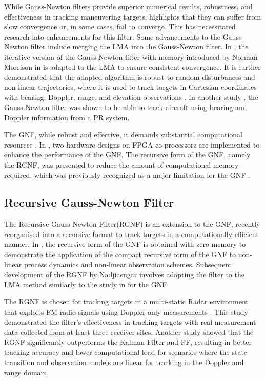 While Gauss-Newton filters provide superior numerical results, robustness, and effectiveness in tracking maneuvering targets, \cite{nmorris2013} highlights that they can suffer from slow convergence or, in some cases, fail to converge. This has necessitated research into enhancements for this filter. Some advancements to the Gauss-Newton filter include merging the \ac{LMA} into the Gauss-Newton filter. In \cite{roaldje}, the iterative version of the Gauss-Newton filter with memory introduced by Norman Morrison in \cite{NmorrisHIll} is adapted to the \ac{LMA} to ensure consistent convergence. It is further demonstrated that the adapted algorithm is robust to random disturbances and non-linear trajectories, where it is used to track targets in Cartesian coordinates with bearing, Doppler, range, and elevation observations \cite{roaldje}. In another study \cite{Morrison}, the Gauss-Newton filter was shown to be able to track aircraft using bearing and Doppler information from a \ac{PR} system.

The \ac{GNF}, while robust and effective, it demands substantial computational resources \cite{improvedGauss}. In \cite{costa}, two hardware designs on \ac{FPGA} co-processors are implemented to enhance the performance of the \ac{GNF}. The recursive form of the \ac{GNF}, namely the \ac{RGNF}, was presented to reduce the amount of computational memory required, which was previously recognized as a major limitation for the \ac{GNF} \cite{Inggs1}.

\subsection{Recursive Gauss-Newton Filter}
The Recursive Gauss Newton Filter(RGNF) is an extension to the \ac{GNF}, recently reorganised into a recursive format to track targets in a computationally efficient manner. In \cite{improvedGauss}, the recursive form of the \ac{GNF} is obtained with zero memory to demonstrate the application of the compact recursive form of the \ac{GNF} to non-linear process dynamics and non-linear observation schemes. Subsequent development of the \ac{RGNF} by Nadjiasngar \cite{Inggs1} involves adapting the filter to the \ac{LMA} method similarly to the study in \cite{roaldje} for the \ac{GNF}.

The \ac{RGNF} is chosen for tracking targets in a multi-static \ac{Radar} environment that exploits FM radio signals using Doppler-only measurements \cite{De2015}. This study demonstrated the filter's effectiveness in tracking targets with real measurement data collected from at least three receiver sites. Another study \cite{Boyer2012} showed that the \ac{RGNF} significantly outperforms the Kalman Filter and \ac{PF}, resulting in better tracking accuracy and lower computational load for scenarios where the state transition and observation models are linear for tracking in the Doppler and range domain.

